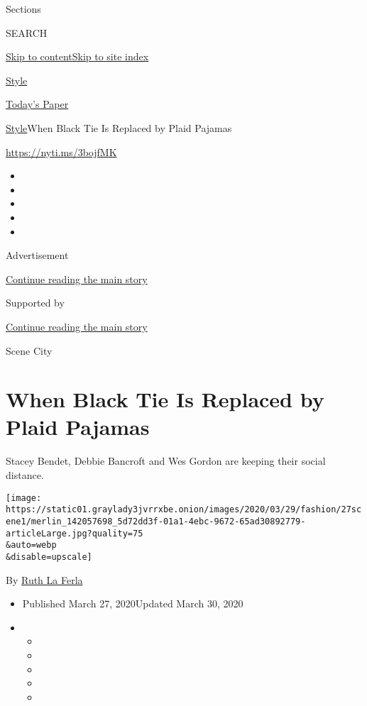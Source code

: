 Sections

SEARCH

\protect\hyperlink{site-content}{Skip to
content}\protect\hyperlink{site-index}{Skip to site index}

\href{https://www.nytimes3xbfgragh.onion/section/style}{Style}

\href{https://myaccount.nytimes3xbfgragh.onion/auth/login?response_type=cookie\&client_id=vi}{}

\href{https://www.nytimes3xbfgragh.onion/section/todayspaper}{Today's
Paper}

\href{/section/style}{Style}\textbar{}When Black Tie Is Replaced by
Plaid Pajamas

\href{https://nyti.ms/3bojfMK}{https://nyti.ms/3bojfMK}

\begin{itemize}
\item
\item
\item
\item
\item
\end{itemize}

Advertisement

\protect\hyperlink{after-top}{Continue reading the main story}

Supported by

\protect\hyperlink{after-sponsor}{Continue reading the main story}

Scene City

\hypertarget{when-black-tie-is-replaced-by-plaid-pajamas}{%
\section{When Black Tie Is Replaced by Plaid
Pajamas}\label{when-black-tie-is-replaced-by-plaid-pajamas}}

Stacey Bendet, Debbie Bancroft and Wes Gordon are keeping their social
distance.

\texttt{[image: https://static01.graylady3jvrrxbe.onion/images/2020/03/29/fashion/27scene1/merlin\_142057698\_5d72dd3f-01a1-4ebc-9672-65ad30892779-articleLarge.jpg?quality=75\\\&auto=webp\\\&disable=upscale]}

By \href{https://www.nytimes3xbfgragh.onion/by/ruth-la-ferla}{Ruth La
Ferla}

\begin{itemize}
\item
  Published March 27, 2020Updated March 30, 2020
\item
  \begin{itemize}
  \item
  \item
  \item
  \item
  \item
  \end{itemize}
\end{itemize}

